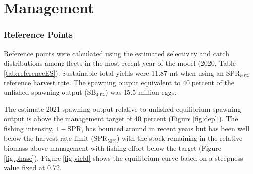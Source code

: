 \documentclass[11pt,
  english,
  a4paper,
]{article}
\begin{document}
\leavevmode\tagmcend\tagstructend\par


\hypertarget{management}{%
\section{Management}\label{management}}

\leavevmode\tagmcend\tagstructend


\hypertarget{reference-points}{%
\subsubsection{Reference Points}\label{reference-points}}

\leavevmode\tagmcend\tagstructend


Reference points were calculated using the estimated selectivity and catch distributions among fleets in the most recent year of the model (2020, Table \ref{tab:referenceES}). Sustainable total yields were 11.87 mt when using an {\(\text{SPR}_{50\%}\)\leavevmode\tagmcend\tagstructend} reference harvest rate. The spawning output equivalent to 40 percent of the unfished spawning output ({\(\text{SB}_{40\%}\)\leavevmode\tagmcend\tagstructend}) was 15.5 million eggs.

\leavevmode\tagmcend\tagstructend\par


The estimate 2021 spawning output relative to unfished equilibrium spawning output is above the management target of 40 percent (Figure \ref{fig:depl}). The fishing intensity, {\(1-\text{SPR}\)\leavevmode\tagmcend\tagstructend}, has bounced around in recent years but has been well below the harvest rate limit ({\(\text{SPR}_{50\%}\)\leavevmode\tagmcend\tagstructend}) with the stock remaining in the relative biomass above management with fishing effort below the target (Figure \ref{fig:phase}). Figure \ref{fig:yield} shows the equilibrium curve based on a steepness value fixed at 0.72.
\end{document}
